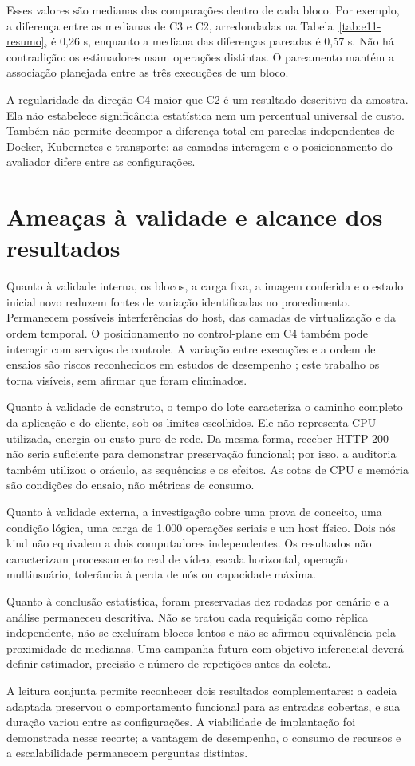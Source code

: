 Esses valores são medianas das comparações dentro de cada bloco. Por exemplo, a diferença entre as medianas de C3 e C2, arredondadas na Tabela~\ref{tab:e11-resumo}, é 0,26 s, enquanto a mediana das diferenças pareadas é 0,57 s. Não há contradição: os estimadores usam operações distintas. O pareamento mantém a associação planejada entre as três execuções de um bloco.

A regularidade da direção C4 maior que C2 é um resultado descritivo da amostra. Ela não estabelece significância estatística nem um percentual universal de custo. Também não permite decompor a diferença total em parcelas independentes de Docker, Kubernetes e transporte: as camadas interagem e o posicionamento do avaliador difere entre as configurações.

\section{Ameaças à validade e alcance dos resultados}

Quanto à validade interna, os blocos, a carga fixa, a imagem conferida e o estado inicial novo reduzem fontes de variação identificadas no procedimento. Permanecem possíveis interferências do host, das camadas de virtualização e da ordem temporal. O posicionamento no control-plane em C4 também pode interagir com serviços de controle. A variação entre execuções e a ordem de ensaios são riscos reconhecidos em estudos de desempenho \cite{maricq2018taming,duplyakin2023ordering}; este trabalho os torna visíveis, sem afirmar que foram eliminados.

Quanto à validade de construto, o tempo do lote caracteriza o caminho completo da aplicação e do cliente, sob os limites escolhidos. Ele não representa CPU utilizada, energia ou custo puro de rede. Da mesma forma, receber HTTP 200 não seria suficiente para demonstrar preservação funcional; por isso, a auditoria também utilizou o oráculo, as sequências e os efeitos. As cotas de CPU e memória são condições do ensaio, não métricas de consumo.

Quanto à validade externa, a investigação cobre uma prova de conceito, uma condição lógica, uma carga de 1.000 operações seriais e um host físico. Dois nós kind não equivalem a dois computadores independentes. Os resultados não caracterizam processamento real de vídeo, escala horizontal, operação multiusuário, tolerância à perda de nós ou capacidade máxima.

Quanto à conclusão estatística, foram preservadas dez rodadas por cenário e a análise permaneceu descritiva. Não se tratou cada requisição como réplica independente, não se excluíram blocos lentos e não se afirmou equivalência pela proximidade de medianas. Uma campanha futura com objetivo inferencial deverá definir estimador, precisão e número de repetições antes da coleta.

A leitura conjunta permite reconhecer dois resultados complementares: a cadeia adaptada preservou o comportamento funcional para as entradas cobertas, e sua duração variou entre as configurações. A viabilidade de implantação foi demonstrada nesse recorte; a vantagem de desempenho, o consumo de recursos e a escalabilidade permanecem perguntas distintas.

